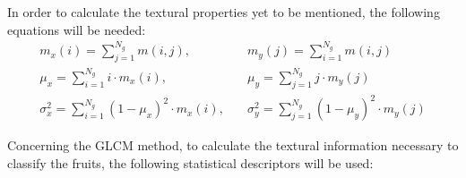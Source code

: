 \documentclass[../main.tex]{subfile}
\begin{document}
    In order to calculate the textural properties yet to be mentioned, the following equations will be needed:
    \begin{align*}
        m_{x}(i) = \sum^{N_{g}}_{j=1} m(i,j),&\quad 
        m_{y}(j) = \sum^{N_{g}}_{i=1} m(i,j) \\
        \mu_{x} = \sum^{N_{g}}_{i=1} i \cdot m_{x}(i),&\quad
        \mu_{y} = \sum^{N_{g}}_{j=1} j \cdot m_{y}(j) \\
        \sigma^{2}_{x} = \sum^{N_{g}}_{i=1} (1 - \mu_{x})^{2} \cdot m_{x}(i),&\quad
        \sigma^{2}_{y} = \sum^{N_{g}}_{j=1} (1 - \mu_{y})^{2} \cdot m_{y}(j)
    \end{align*}
    
    Concerning the GLCM method, to calculate the textural information necessary to classify the fruits, the following statistical descriptors will be used:
    
\end{document}
